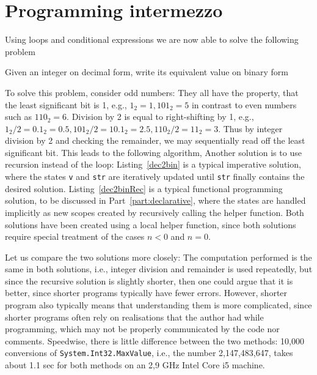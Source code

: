 \section{Programming intermezzo}
Using loops and conditional expressions we are now able to solve the following problem
\begin{problem}
  Given an integer on decimal form, write its equivalent value on binary form
\end{problem}
To solve this problem, consider odd numbers: They all have the property, that the least significant bit is 1, e.g., $1_2 = 1, 101_2 = 5$ in contrast to even numbers such as $110_2 = 6$. Division by 2 is equal to right-shifting by 1, e.g., $1_2/2 = 0.1_2 = 0.5, 101_2/2 = 10.1_2 = 2.5, 110_2/2 = 11_2 = 3$. Thus by integer division by 2 and checking the remainder, we may sequentially read off the least significant bit. This leads to the following algorithm,
%
%
Another solution is to use recursion instead of the  loop:
%
%
Listing~\ref{dec2bin} is a typical imperative solution, where the states \lstinline!v! and \lstinline!str! are iteratively updated until \lstinline!str! finally contains the desired solution. Listing~\ref{dec2binRec} is a typical functional programming solution, to be discussed in Part~\ref{part:declarative}, where the states are handled implicitly as new scopes created by recursively calling the helper function. Both solutions have been created using a local helper function, since both solutions require special treatment of the cases $n<0$ and $n=0$. 

Let us compare the two solutions more closely: The computation performed is the same in both solutions, i.e., integer division and remainder is used repeatedly, but since the recursive solution is slightly shorter, then one could argue that it is better, since shorter programs typically have fewer errors. However, shorter program also typically means that understanding them is more complicated, since shorter programs often rely on realisations that the author had while programming, which may not be properly communicated by the code nor comments. Speedwise, there is little difference between the two methods: 10,000 conversions of \lstinline!System.Int32.MaxValue!, i.e., the number 2,147,483,647, takes about 1.1 sec for both methods on an 2,9 GHz Intel Core i5 machine.

